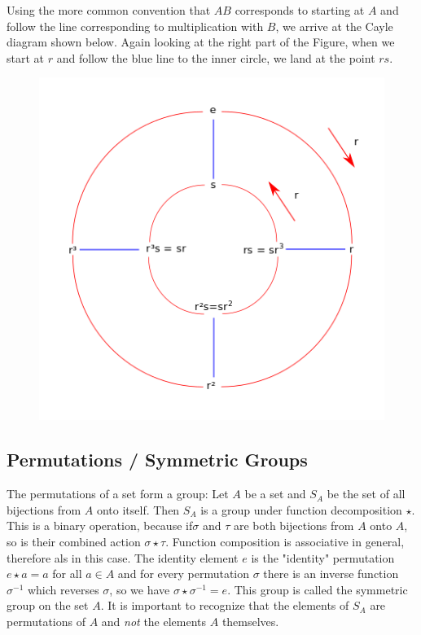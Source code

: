 Using the more common convention that $AB$ corresponds to starting at $A$ and follow the line corresponding to  multiplication with $B$, we arrive at the Cayle diagram shown below. Again looking at the right part of the Figure, when we start at $r$ and follow the blue line to the inner circle, we land at the point $rs$.

\begin{figure}[H]
\centering
\includegraphics[scale=0.55]{images/groups_04_5.png}
\end{figure}

\subsection{Permutations / Symmetric Groups}

The permutations of a set form a group: Let $A$ be a set and $S_A$ be the set of all bijections from $A$ onto itself. Then $S_A$ is a group under function decomposition $\star$. This is a binary operation, because if$\sigma$ and $\tau$ are both bijections from $A$ onto $A$, so is their combined action $\sigma \star \tau$. Function composition is associative in general, therefore als in this case. The identity element $e$ is the "identity" permutation $e \star a = a$ for all $a \in A$ and for every permutation $\sigma$ there is an inverse function $\sigma^{-1}$ which reverses $\sigma$, so we have $\sigma \star \sigma^{-1} = e$. This group is called the symmetric group on the set $A$. It is important to recognize that the elements of $S_A$ are permutations of $A$ and \emph{not} the elements $A$ themselves.

